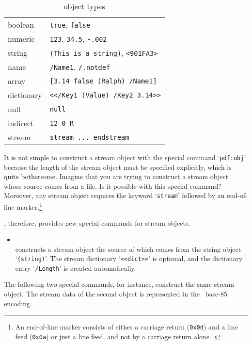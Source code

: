 \documentclass[final]{ltugboat}
\let\DPX\DVIPDFMx
\def\fafter{1.5pt}
\let\note=\footnote
\begin{document}
\begin{table}[h]
\begin{tabular}{|l|p{2.1in}|} \hline
boolean & \texttt{true}, \texttt{false} \\
numeric & \texttt{123}, \texttt{34.5}, \texttt{-.002} \\
string & \texttt{(This is a string)}, \texttt{<901FA3>} \\
name & \texttt{/Name1}, \texttt{/.notdef} \\
array & \texttt{[3.14 false (Ralph) /Name1]} \\
dictionary & \texttt{<</Key1 (Value) /Key2 3.14>>} \\
null & \texttt{null} \\\hline
indirect & \texttt{12 0 R} \\
stream & \texttt{stream ... endstream} \\
\hline
\end{tabular}
\caption{\PDF\ object types~\cite[p.~51]{PDFReference}}
\label{Table2}
\end{table}

It is not simple to construct a stream object with the special command `\texttt{pdf:obj}' because
the length of the stream object must be specified explicitly, which is quite bothersome.
Imagine that you are trying to construct a stream object whose source comes from a file.
Is it possible with this special command?
Moreover, any stream object requires the keyword `\texttt{stream}' followed by an end-of-line marker.\note{%
An end-of-line marker consists of either a carriage return (\texttt{0x0d}) and a line feed (\texttt{0x0a}) or just a line feed, and not by a carriage return alone~\cite[pp.~60--61]{PDFReference}.}

\DPX, therefore, provides new special commands for stream objects.

\begin{itemize}
\item{} \\[\fafter]
constructs a stream object the source of which comes from the string object `\texttt{(string)}'.
The stream dictionary `\texttt{<<dict>>}' is optional, and the dictionary entry `\texttt{/Length}' is created automatically.
\end{itemize}

\noindent
The following two special commands, for instance, construct the same stream object.
The stream data of the second object is represented in the \ASCII\ base-85 encoding.~\cite[p.~70]{PDFReference}
\end{document}
